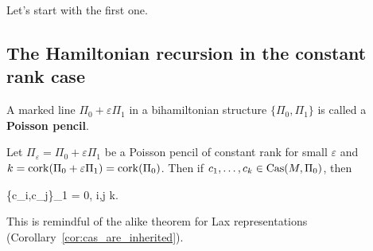 \documentclass[main.tex]{subfiles}
\begin{document}
Let's start with the first one.

\subsection{The Hamiltonian recursion in the constant rank case}
\begin{definition}
	A marked line $\Pi_0 + \varepsilon \Pi_1$ in a bihamiltonian structure $\{\Pi_0, \Pi_1\}$ is called a \textbf{Poisson pencil}.
\end{definition}

\begin{lemma}
\label{lemma:comp_poisson_of_const_rank_same_cas}
	Let $\Pi_\varepsilon = \Pi_0 + \varepsilon \Pi_1$ be a Poisson pencil of constant rank for small $\varepsilon$ and $k = \operatorname{cork}(\Pi_0 + \varepsilon\Pi_1) = \operatorname{cork}(\Pi_0)$. Then if $c_1, \ldots, c_k \in \mathrm{Cas}(M, \Pi_0)$, then
	\begin{eqalign}
		\{c_i,c_j\}_1 = 0, \quad \forall i,j \leq k.
	\end{eqalign}
\end{lemma}
\begin{remark}
	This is remindful of the alike theorem for Lax representations (Corollary~\ref{cor:cas_are_inherited}).
\end{remark}
\end{document}
